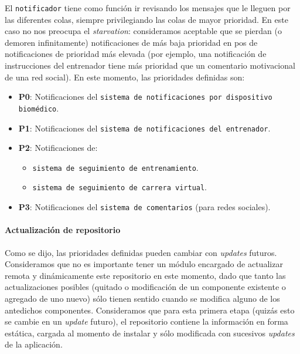 El \texttt{notificador} tiene como función ir revisando los mensajes que le lleguen por las diferentes colas, siempre privilegiando las colas de mayor prioridad. En este caso no nos preocupa el \emph{starvation}: consideramos aceptable que se pierdan (o demoren infinitamente) notificaciones de más baja prioridad en pos de notificaciones de prioridad más elevada (por ejemplo, una notificación de instrucciones del entrenador tiene más prioridad que un comentario motivacional de una red social). En este momento, las prioridades definidas son:
\begin{itemize}
	\item \textbf{P0}: Notificaciones del \texttt{sistema de notificaciones por dispositivo biomédico}. 
	\item \textbf{P1}: Notificaciones del \texttt{sistema de notificaciones del entrenador}.
	\item \textbf{P2}: Notificaciones de: 
	\begin{itemize}
		\item \texttt{sistema de seguimiento de entrenamiento}.
		\item \texttt{sistema de seguimiento de carrera virtual}.
	\end{itemize}
	\item \textbf{P3}: Notificaciones del \texttt{sistema de comentarios} (para redes sociales).
\end{itemize}

\paragraph{Actualización de repositorio}
Como se dijo, las prioridades definidas pueden cambiar con \emph{updates} futuros. Consideramos que no es importante tener un módulo encargado de actualizar remota y dinámicamente este repositorio en este momento, dado que tanto las actualizaciones posibles (quitado o modificación de un componente existente o agregado de uno nuevo) sólo tienen sentido cuando se modifica alguno de los antedichos componentes. Consideramos que para esta primera etapa (quizás esto se cambie en un \emph{update} futuro), el repositorio contiene la información en forma estática, cargada al momento de instalar y sólo modificada con sucesivos \emph{updates} de la aplicación.
